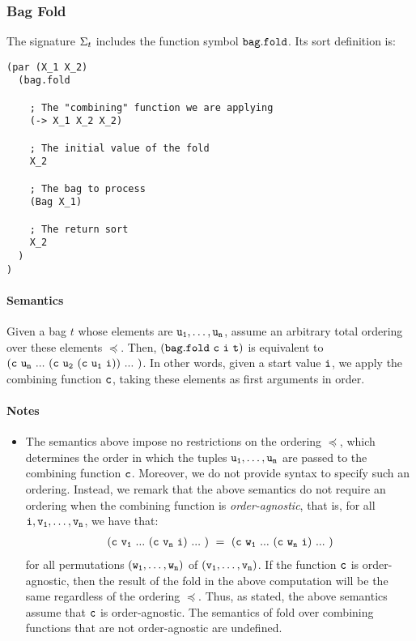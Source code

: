 \documentclass[english,a4paper,10pt]{article}
\begin{document}
\subsubsection{Bag Fold}
\label{sec:fold}
The signature $\Sigma_{t}$ includes 
the function symbol ${\tt bag.fold}$. Its sort definition is:

\begin{verbatim}
(par (X_1 X_2)
  (bag.fold
    
    ; The "combining" function we are applying
    (-> X_1 X_2 X_2)
    
    ; The initial value of the fold
    X_2
  
    ; The bag to process
    (Bag X_1)
    
    ; The return sort
    X_2
  )
)
\end{verbatim}


\paragraph{Semantics}
Given a bag $t$ whose elements are ${\tt u_1}, \ldots, {\tt u_n}$,
assume an arbitrary total ordering over these elements $\preceq$.
Then, ${\tt (bag.fold\ c\ i\ t)}$ is equivalent to
$
{\tt 
(c\ u_n\ ...\ (c\ u_2\ (c\ u_1\ i))\ ...\ )
}
$.
In other words, given a start value ${\tt i}$,
we apply the combining function ${\tt c}$, taking these elements
as first arguments in order.

\paragraph{Notes}
\begin{itemize}
\item
The semantics above impose no restrictions on the ordering $\preceq$,
which determines the order in which the tuples ${\tt u_1}, \ldots, {\tt u_n}$
are passed to the combining function ${\tt c}$.
Moreover, 
we do not provide syntax to specify such an ordering.
Instead, 
we remark that the above semantics
do not require an ordering when the combining function is
\emph{order-agnostic},
that is, for all ${\tt i}, {\tt v_1}, \ldots, {\tt v_n}$,
we have that:
\begin{eqnarray*}
\syntax{(c\ v_1\ ...\ (c\ v_n\ i)\ ...\ )\ =\ (c\ w_1\ ...\ (c\ w_n\ i)\ ...\ )}
\end{eqnarray*}
for all permutations $( {\tt w_1}, \ldots, {\tt w_n} )$ of $( {\tt v_1}, \ldots, {\tt v_n} )$.
If the function ${\tt c}$ is order-agnostic,
then the result of the fold in the above computation will be the same regardless
of the ordering $\preceq$.
Thus, as stated, the above semantics assume that ${\tt c}$ is order-agnostic.
The semantics
of fold over combining functions that are not order-agnostic are undefined.
\end{itemize}
\end{document}
